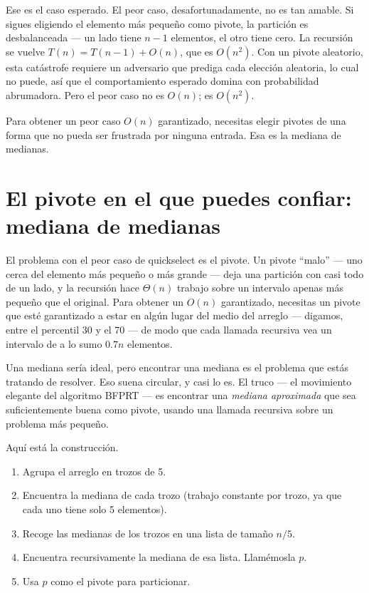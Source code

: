 \documentclass[11pt,a4paper]{article}
\begin{document}
Ese es el caso esperado. El peor caso, desafortunadamente, no es tan amable. Si sigues eligiendo el elemento más pequeño como pivote, la partición es desbalanceada --- un lado tiene $n-1$ elementos, el otro tiene cero. La recursión se vuelve $T(n) = T(n-1) + O(n)$, que es $O(n^2)$. Con un pivote aleatorio, esta catástrofe requiere un adversario que prediga cada elección aleatoria, lo cual no puede, así que el comportamiento esperado domina con probabilidad abrumadora. Pero el peor caso no es $O(n)$; es $O(n^2)$.

Para obtener un peor caso $O(n)$ garantizado, necesitas elegir pivotes de una forma que no pueda ser frustrada por ninguna entrada. Esa es la mediana de medianas.

\section{El pivote en el que puedes confiar: mediana de medianas}

El problema con el peor caso de quickselect es el pivote. Un pivote ``malo'' --- uno cerca del elemento más pequeño o más grande --- deja una partición con casi todo de un lado, y la recursión hace $\Theta(n)$ trabajo sobre un intervalo apenas más pequeño que el original. Para obtener un $O(n)$ garantizado, necesitas un pivote que esté garantizado a estar en algún lugar del medio del arreglo --- digamos, entre el percentil 30 y el 70 --- de modo que cada llamada recursiva vea un intervalo de a lo sumo $0.7n$ elementos.

Una mediana sería ideal, pero encontrar una mediana es el problema que estás tratando de resolver. Eso suena circular, y casi lo es. El truco --- el movimiento elegante del algoritmo BFPRT --- es encontrar una \emph{mediana aproximada} que sea suficientemente buena como pivote, usando una llamada recursiva sobre un problema más pequeño.

Aquí está la construcción.

\begin{enumerate}
\item Agrupa el arreglo en trozos de 5.
\item Encuentra la mediana de cada trozo (trabajo constante por trozo, ya que cada uno tiene solo 5 elementos).
\item Recoge las medianas de los trozos en una lista de tamaño $n/5$.
\item Encuentra recursivamente la mediana de esa lista. Llamémosla $p$.
\item Usa $p$ como el pivote para particionar.
\end{enumerate}
\end{document}
